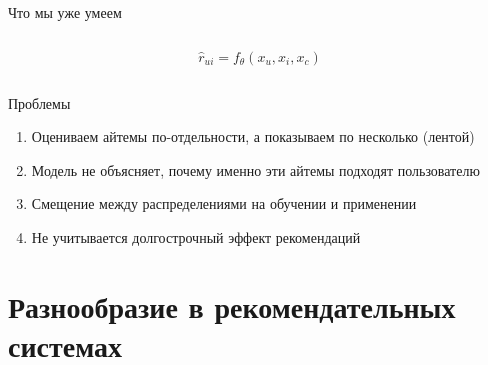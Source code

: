 \documentclass[11pt,aspectratio=169,handout]{beamer}
\begin{document}
\begin{frame}{Что мы уже умеем}

\begin{columns}

\begin{column}{0.2\textwidth}

\end{column}

\begin{column}{0.5\textwidth} 

\begin{tcolorbox}[colback=info!5,colframe=info!80,title=]
\begin{Large}
\[
\hat r_{ui} = f_{\theta}(x_u, x_i, x_c)
\]
\end{Large}
\end{tcolorbox}

\end{column}

\begin{column}{0.2\textwidth} 

\end{column}
\end{columns}

\vfill

Проблемы
\begin{enumerate}[<+->]
\item Оцениваем айтемы по-отдельности, а показываем по несколько (лентой)
\item Модель не объясняет, почему именно эти айтемы подходят пользователю
\item Смещение между распределениями на обучении и применении
\item Не учитывается долгострочный эффект рекомендаций
\end{enumerate}

\end{frame}

\section{Разнообразие в рекомендательных системах}
\end{document}
